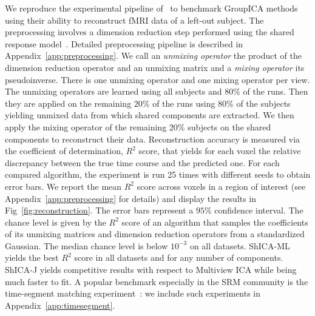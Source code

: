 We reproduce the experimental pipeline of~\cite{richard2020modeling} to benchmark GroupICA methods using their ability to reconstruct fMRI data of a left-out subject.
%
The preprocessing involves a dimension reduction step performed using the shared response model~\cite{chen2015reduced}. Detailed preprocessing pipeline is described in Appendix~\ref{app:preprocessing}. We call an \emph{unmixing operator} the product of the dimension
reduction operator and an unmixing matrix and a \emph{mixing operator} its pseudoinverse. There is one unmixing operator and one mixing operator per view.
The unmixing operators are learned using all subjects
and $80\%$ of the runs. Then they are applied on the remaining $20\%$ of the runs using $80\%$
of the subjects yielding unmixed data from which shared components are extracted. We
then apply the mixing operator of the remaining $20\%$ subjects on the shared components to reconstruct their data.
%
Reconstruction accuracy is measured via the coefficient of determination, \aka
$R^2$ score, that
yields for each voxel the relative discrepancy between the true time course and the predicted one.
%
For each compared algorithm, the experiment is run 25 times with different seeds to obtain error bars. We report the mean $R^2$ score across voxels in a region of interest (see Appendix~\ref{app:preprocessing} for details)
 and display the results in Fig~\ref{fig:reconstruction}. The error bars represent a $95\%$ confidence interval.
The chance level is given by the $R^2$ score of an algorithm that samples the coefficients of its unmixing matrices and dimension reduction operators from a standardized Gaussian. The median chance level is below $10^{-3}$ on all datasets. 
ShICA-ML yields the best $R^2$ score in all datasets and for any number of components. ShICA-J yields competitive results with respect to Multiview ICA while being much faster to fit. A popular benchmark especially in the SRM community is the time-segment matching experiment~\cite{chen2015reduced}: we include such experiments in Appendix~\ref{app:timesegment}.


% 

